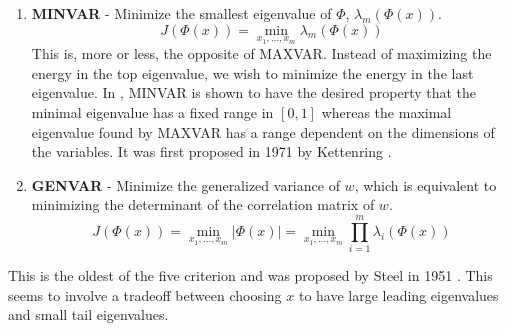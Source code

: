 \begin{enumerate}
\item \textbf{MINVAR} - Minimize the smallest eigenvalue of $\Phi$, $\lambda_m(\Phi(x))$.
  \begin{equation*}
    J(\Phi(x)) = \min_{x_1,\dots,x_m}\lambda_m(\Phi(x))
  \end{equation*}
  This is, more or less, the opposite of MAXVAR. Instead of maximizing the energy in the
  top eigenvalue, we wish to minimize the energy in the last eigenvalue. In
  \cite{bach2003kernel}, MINVAR is shown to have the desired property that the minimal
  eigenvalue has a fixed range in $[0,1]$ whereas the maximal eigenvalue found by MAXVAR
  has a range dependent on the dimensions of the variables. It was first proposed in 1971
  by Kettenring \cite{kettenring1971canonical}.

\item \textbf{GENVAR} - Minimize the generalized variance of $w$, which is equivalent to
  minimizing the determinant of the correlation matrix of $w$.
  \begin{equation*}
    J(\Phi(x)) = \min_{x_1,\dots,x_m}\left|\Phi(x)\right| = \min_{x_1,\dots,x_m}\prod_{i=1}^m\lambda_i(\Phi(x))
  \end{equation*}
\end{enumerate}
This is the oldest of the five criterion and was proposed by Steel in 1951
\cite{steel1951minimum}. This seems to involve a tradeoff between choosing $x$ to have
large leading eigenvalues and small tail eigenvalues.

